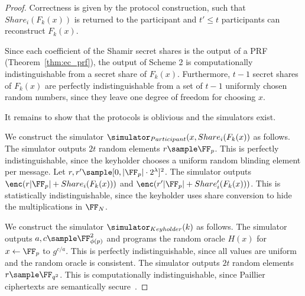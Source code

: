 \begin{proof}
Correctness is given by the protocol construction, such that $Share_{i}(F_{k}(x))$ is returned to the participant and $t' \leq t$ participants can reconstruct $F_k(x)$.

Since each coefficient of the Shamir secret shares is the output of a PRF (Theorem~\ref{thm:ec_prf}), the output of Scheme 2 is computationally indistinguishable from a secret share of $F_{k}(x)$.
Furthermore, $t-1$ secret shares of $F_{k}(x)$ are perfectly indistinguishable from a set of $t-1$ uniformly chosen random numbers, since they leave one degree of freedom for choosing $x$.

It remains to show that the protocols is oblivious and the simulators exist.

We construct the simulator $\simulator_{Participant}(x, Share_{i}(F_{k}(x))$ as follows.
The simulator outputs $2t$ random elements $r \sample \FF_p$.
This is perfectly indistinguishable, since the keyholder chooses a uniform random blinding element per message.
Let $r, r' \sample [0, |\FF_p| \cdot 2^{\lambda}]^2$.
The simulator outputs $\enc(r |\FF_p| + Share_{i}(F_{k}(x)))$ and $\enc(r' |\FF_p| + Share'_{i}(F_{k}(x)))$.
This is statistically indistinguishable, since the keyholder uses share conversion to hide the multiplications in $\FF_N$.

We construct the simulator $\simulator_{Keyholder}(k)$ as follows.
The simulator outputs $a, c \sample \FF_{\phi(p)}^2$ and programs the random oracle $H(x)$ for $x \gets \FF_p$ to $g^{c/a}$.
This is perfectly indistinguishable, since all values are uniform and the random oracle is consistent.
The simulator outputs $2t$ random elements $r \sample \FF_{q^2}$.
This is computationally indistinguishable, since Paillier ciphertexts are semantically secure~\cite{Paillier}.

\end{proof}
